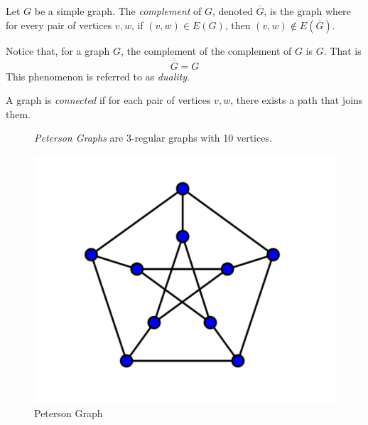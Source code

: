 \begin{definition}
  Let \(G\) be a simple graph. The \textit{complement} of \(G\), denoted
  \(\overline{G}\), is the graph where for every pair of vertices \(v, w\), if
  \((v, w) \in E(G)\), then \((v, w) \notin E(\overline{G})\).
\end{definition}

\begin{remark}[Duality]
  Notice that, for a graph \(G\), the complement of the complement of \(G\) is
  \(G\). That is 
  \[ \overline{\overline{G}} = G \]
  This phenomenon is referred to as \textit{duality}.
\end{remark}

\begin{definition}
  A graph is \textit{connected} if for each pair of vertices \(v, w\), there
  exists a path that joins them.
\end{definition}

\begin{figure}[ht]
\begin{nexample}
    \textit{Peterson Graphs} are \(3\)-regular graphs with 10 vertices.
   
  \begin{center}
    \includegraphics{figures/l01/peterson-graph}
  \end{center}
  \caption{Peterson Graph}\label{fig:l01-peterson-graph}
\end{nexample}
\end{figure}

